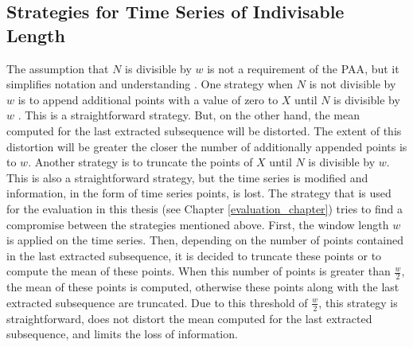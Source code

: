 \subsection*{Strategies for Time Series of Indivisable Length}
The assumption that $N$ is divisible by $w$ is not a requirement of the \ac{PAA}, but it simplifies notation and understanding \cite{PAA_Keogh}. \newline
One strategy when $N$ is not divisible by $w$ is to append additional points with a value of zero to $X$ until $N$ is divisible by $w$ \cite{PAA_Yi_Faloutsos}. This is a straightforward strategy. But, on the other hand, the mean computed for the last extracted subsequence will be distorted. The extent of this distortion will be greater the closer the number of additionally appended points is to $w$. \newline
Another strategy is to truncate the points of $X$ until $N$ is divisible by $w$. This is also a straightforward strategy, but the time series is modified and information, in the form of time series points, is lost. \newline
The strategy that is used for the evaluation in this thesis (see Chapter \ref{evaluation_chapter}) tries to find a compromise between the strategies mentioned above. First, the window length $w$ is applied on the time series. Then, depending on the number of points contained in the last extracted subsequence, it is decided to truncate these points or to compute the mean of these points. When this number of points is greater than $\frac{w}{2}$, the mean of these points is computed, otherwise these points along with the last extracted subsequence are truncated. Due to this threshold of $\frac{w}{2}$, this strategy is straightforward, does not distort the mean computed for the last extracted subsequence, and limits the loss of information.
